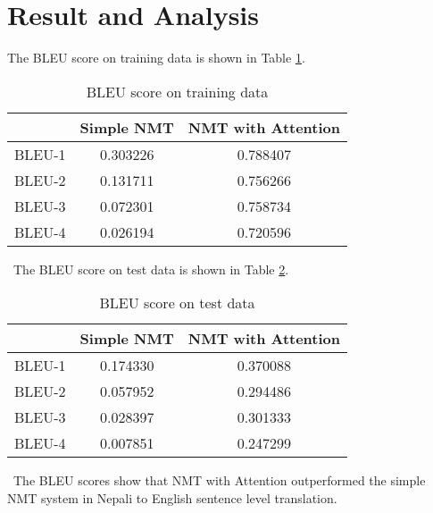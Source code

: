 \section{Result and Analysis}
The BLEU score on training data is shown in Table \ref{table:5.1}.
\begin{table}[H]
\centering
\def\arraystretch{1.25}
\caption{BLEU score on training data}
\label{table:5.1}
\vspace{5pt}
\begin{tabular}{|c|c|c|} \hline
& \textbf{Simple NMT} & \textbf{NMT with Attention} \\ \hline
BLEU-1 & 0.303226 & 0.788407 \\ \hline
BLEU-2 & 0.131711 & 0.756266 \\ \hline
BLEU-3 & 0.072301 & 0.758734 \\ \hline
BLEU-4 & 0.026194 & 0.720596 \\ \hline
\end{tabular}
\end{table}
\
The BLEU score on test data is shown in Table \ref{table:5.2}.
\begin{table}[H]
\centering
\def\arraystretch{1.25}
\caption{BLEU score on test data}
\label{table:5.2}
\vspace{5pt}
\begin{tabular}{|c|c|c|} \hline
& \textbf{Simple NMT} & \textbf{NMT with Attention} \\ \hline
BLEU-1 & 0.174330 & 0.370088 \\ \hline
BLEU-2 & 0.057952 & 0.294486 \\ \hline
BLEU-3 & 0.028397 & 0.301333 \\ \hline
BLEU-4 & 0.007851 & 0.247299 \\ \hline
\end{tabular}
\end{table}
\
The BLEU scores show that NMT with Attention outperformed the simple NMT system in Nepali to English sentence level translation.